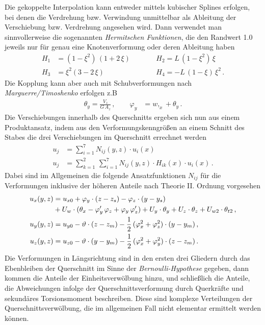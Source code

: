 Die gekoppelte Interpolation kann entweder mittels kubischer Splines erfolgen, bei denen die Verdrehung bzw. Verwindung unmittelbar als Ableitung der Verschiebung bzw. Verdrehung angesehen wird. Dann verwendet man sinnvollerweise die sogenannten {\em Hermitschen Funktionen\/}, die den Randwert 1.0 jeweils nur f\"{u}r genau eine Knotenverformung oder deren Ableitung haben
\begin{subequations}
\begin{alignat}{2}
H_1 &= (1 - \xi^2)\,( 1 + 2\,\xi) \qquad &&H_2= L\,(1 - \xi^2)\,\xi \\
H_3 &= \xi^2(3 - 2\,\xi) \qquad && H_4= - L\,(1 - \xi)\,\xi^2\,.
\end{alignat}
\end{subequations}
Die Kopplung kann aber auch mit Schubverformungen nach {\em Mar\-gu\-erre/Timo\-shen\-ko\/} erfolgen
z.B
\begin{align}
\theta_y = \frac{V_z}{G\,A_z}\,, \qquad \varphi_y &= w,_x + \theta_y \,.
\end{align}
Die Verschiebungen innerhalb des Querschnitts ergeben sich nun aus einem Produktansatz, indem aus den Verformungskenngr\"{o}{\ss}en an einem Schnitt des Stabes die drei Verschiebungen im Querschnitt errechnet werden
\begin{subequations}
\begin{align}
u_j &= \sum_{i = 1}^7 N_{ij}(y,z) \cdot u_i(x) \\
u_j &= \sum_{k = 1}^2\,\sum_{i = 1}^7 N_{ij}(y,z) \cdot H_{ik}(x) \cdot u_i(x)\,.
\end{align}
\end{subequations}
Dabei sind im Allgemeinen die folgende Ansatzfunktionen $N_{ij}$ f\"{u}r die Verformungen
inklusive der h\"{o}heren Anteile nach Theorie II. Ordnung vorgesehen
\begin{subequations}
\begin{align}
u_x(y,z) &= u_{x0} + \varphi_y \cdot (z - z_s) - \varphi_z \cdot (y - y_s) \nonumber  \\
&+ U_w \cdot (\theta_x - \varphi_y'\,\varphi_z + \varphi_y\,\varphi_z') + U_y \cdot \theta_y + U_z \cdot \theta_z + U_{w2} \cdot \theta_{t2}\,, \\
u_y(y,z) &= u_{y0} - \vartheta \cdot ( z - z_m) - \frac{1}{2}\,(\varphi_x^2 + \varphi_z^2) \cdot
(y - y_m)\,, \\
u_z(y,z) &= u_{z0} - \vartheta \cdot ( y - y_m) - \frac{1}{2}\,(\varphi_x^2 + \varphi_y^2) \cdot
(z - z_m)\,.
\end{align}
\end{subequations}
Die Verformungen in L\"{a}ngsrichtung sind in den ersten drei Gliedern durch das Ebenbleiben der Querschnitt im Sinne der {\em Bernoulli-Hypothese\/} gegeben, dann kommen die Anteile der Einheitsverw\"{o}lbung hinzu, und schlie{\ss}lich die Anteile, die Abweichungen infolge der Querschnittsverformung durch Querkr\"{a}fte und sekund\"{a}res Torsionsmoment beschreiben. Diese sind komplexe Verteilungen der Querschnittsverw\"{o}lbung, die im allgemeinen Fall nicht elementar ermittelt werden k\"{o}nnen.

